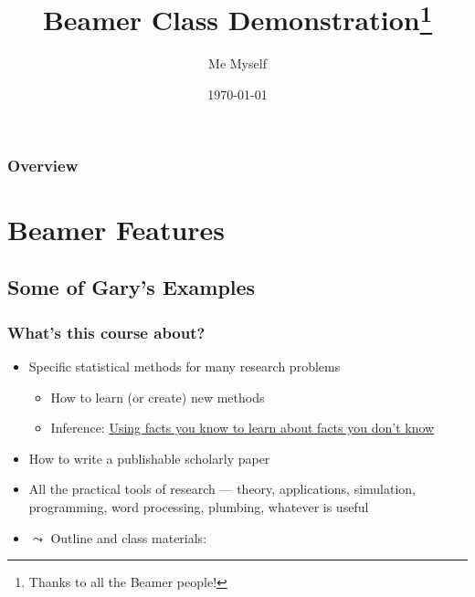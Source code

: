 \documentclass[11pt]{beamer}
\title{Beamer Class Demonstration\thanks{Thanks to all the Beamer people!}}
\author{Me Myself}
\date{\today}
\institute{IQSS}
\begin{document}
\begin{frame}
  \maketitle
\end{frame}

\begin{frame}
  \frametitle{Overview}
  \tableofcontents
\end{frame}

\section{Beamer Features}

\subsection{Some of Gary's Examples}

\begin{frame}\frametitle{What's this course about?}
  \begin{itemize}
  \item \alert{Specific statistical methods for many research problems}
    \begin{itemize}
    \item How to learn (or create) new methods
    \item Inference: \underline{Using facts you know to learn about
        facts you don't know}
    \end{itemize}
  \item \alert{How to write a publishable scholarly paper}
  \item \alert{All the practical tools of research} --- theory,
    applications, simulation, programming, word processing, plumbing,
    whatever is useful
  \item $\leadsto$ \alert{Outline and class materials:}
  \end{itemize}
\end{frame}
\end{document}
